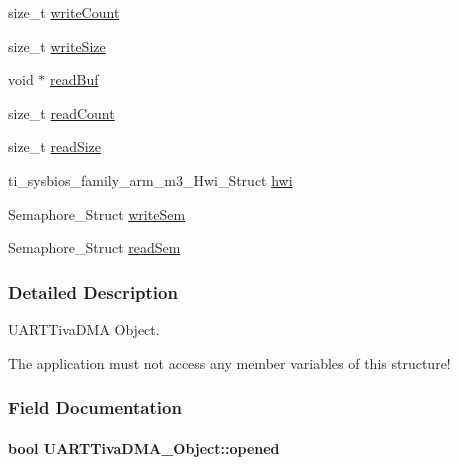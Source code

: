 \begin{DoxyCompactItemize}
\item 
size\+\_\+t \hyperlink{struct_u_a_r_t_tiva_d_m_a___object_a34199d43e13d70dfcd8b640cd772a4bc}{write\+Count}
\item 
size\+\_\+t \hyperlink{struct_u_a_r_t_tiva_d_m_a___object_ab75f4cfd55f7c15c80f1dc03638fd575}{write\+Size}
\item 
void $\ast$ \hyperlink{struct_u_a_r_t_tiva_d_m_a___object_a61fc144c2eaaed90683d30f1c6949f33}{read\+Buf}
\item 
size\+\_\+t \hyperlink{struct_u_a_r_t_tiva_d_m_a___object_a5c90720b132e067ab8a8acfa34409310}{read\+Count}
\item 
size\+\_\+t \hyperlink{struct_u_a_r_t_tiva_d_m_a___object_ad223d07a1814962421a0968e787449cc}{read\+Size}
\item 
ti\+\_\+sysbios\+\_\+family\+\_\+arm\+\_\+m3\+\_\+\+Hwi\+\_\+\+Struct \hyperlink{struct_u_a_r_t_tiva_d_m_a___object_a6d53ea962b0b237a2d53937665733798}{hwi}
\item 
Semaphore\+\_\+\+Struct \hyperlink{struct_u_a_r_t_tiva_d_m_a___object_aa594694853d811a1e06cc553f90acb2c}{write\+Sem}
\item 
Semaphore\+\_\+\+Struct \hyperlink{struct_u_a_r_t_tiva_d_m_a___object_a8d92851a2c895c372a500654d7a483a9}{read\+Sem}
\end{DoxyCompactItemize}


\subsubsection{Detailed Description}
U\+A\+R\+T\+Tiva\+D\+M\+A Object. 

The application must not access any member variables of this structure! 

\subsubsection{Field Documentation}
\paragraph[{opened}]{\setlength{\rightskip}{0pt plus 5cm}bool U\+A\+R\+T\+Tiva\+D\+M\+A\+\_\+\+Object\+::opened}\label{struct_u_a_r_t_tiva_d_m_a___object_a01c01877d64d61e31bb34441cb6acd09}
